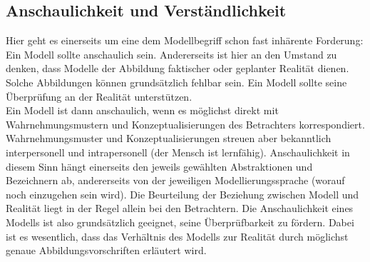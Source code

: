 \subsection{Anschaulichkeit und Verständlichkeit}
Hier geht es einerseits um eine dem Modellbegriff schon fast inhärente Forderung: Ein Modell sollte
anschaulich sein. Andererseits ist hier an den Umstand zu denken, dass Modelle der Abbildung faktischer
oder geplanter Realität dienen. Solche Abbildungen können grundsätzlich fehlbar sein. Ein
Modell sollte seine Überprüfung an der Realität unterstützen. \\

Ein Modell ist dann anschaulich, wenn es möglichst direkt mit Wahrnehmungsmustern und Konzeptualisierungen
des Betrachters korrespondiert. Wahrnehmungsmuster und Konzeptualisierungen
streuen aber bekanntlich interpersonell und intrapersonell (der Mensch ist lernfähig). Anschaulichkeit
in diesem Sinn hängt einerseits den jeweils gewählten Abstraktionen und Bezeichnern ab, andererseits
von der jeweiligen Modellierungssprache (worauf noch einzugehen sein wird). Die Beurteilung der
Beziehung zwischen Modell und Realität liegt in der Regel allein bei den Betrachtern. Die Anschaulichkeit
eines Modells ist also grundsätzlich geeignet, seine Überprüfbarkeit zu fördern. Dabei ist es wesentlich,
dass das Verhältnis des Modells zur Realität durch möglichst genaue Abbildungsvorschriften
erläutert wird. \\
